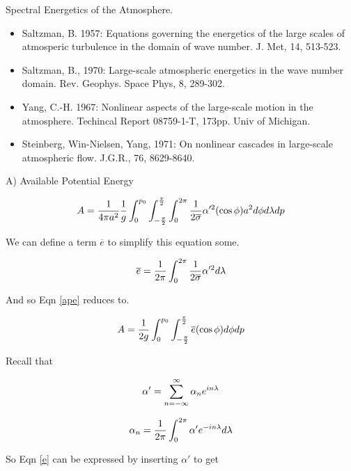 \documentclass{article}
\begin{document}
Spectral Energetics of the Atmosphere.

\begin{itemize}

\item Saltzman, B. 1957: Equations governing the energetics of the large scales of atmosperic turbulence in the domain of wave number. J. Met, 14, 513-523.

\item Saltzman, B., 1970: Large-scale atmospheric energetics in the wave number domain.  Rev. Geophys. Space Phys, 8, 289-302.

\item Yang, C.-H. 1967: Nonlinear aspects of the large-scale motion in the atmosphere.  Techincal Report 08759-1-T, 173pp.  Univ of Michigan.

\item Steinberg, Win-Nielsen, Yang, 1971: On nonlinear cascades in large-scale atmospheric flow.  J.G.R., 76, 8629-8640.

\end{itemize}

A) Available Potential Energy

\begin{equation}
A = \frac{1}{4 \pi a^2}\frac{1}{g} \int_{0}^{p_0} \int_{-\frac{\pi}{2}}^{\frac{\pi}{2}} \int_{0}^{2\pi} \frac{1}{2\overline{\sigma}} \alpha'^2 (\cos{\phi}) a^2 d\phi d\lambda dp
\label{ape}
\end{equation}

We can define a term $\overline{e}$ to simplify this equation some.

\begin{equation}
\overline{e} = \frac{1}{2\pi} \int_{0}^{2\pi} \frac{1}{2\overline{\sigma}} \alpha'^2 d\lambda
\label{e}
\end{equation}

And so Eqn \ref{ape} reduces to.

\begin{equation}
A = \frac{1}{2g} \int_{0}^{p_0} \int_{-\frac{\pi}{2}}^{\frac{\pi}{2}} \overline{e} (\cos{\phi}) d\phi dp
\end{equation}

Recall that 

\begin{equation}
\alpha' = \sum_{n=-\infty}^{\infty} \alpha_n e^{in\lambda}
\label{alphaprime}
\end{equation}

\begin{equation}
\alpha_n = \frac{1}{2\pi} \int_{0}^{2\pi} \alpha' e^{-in\lambda} d\lambda
\label{alphan}
\end{equation}

So Eqn \ref{e} can be expressed by inserting $\alpha'$ to get
\end{document}
